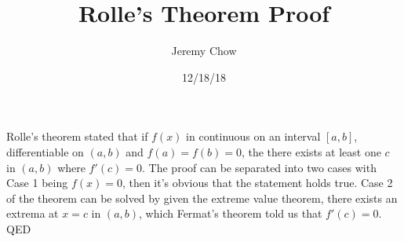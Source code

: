 \documentclass[12pt]{article}
\title{Rolle's Theorem Proof}
\author{Jeremy Chow}
\date{12/18/18}
\begin{document}
\maketitle
Rolle's theorem stated that if $f(x)$ in continuous on an interval $[a,b]$, differentiable on $(a,b)$ and $f(a)=f(b)=0$, the there exists at least one $c$ in $(a,b)$ where $f'(c)=0$. The proof can be separated into two cases with Case 1 being $f(x)=0$, then it's obvious that the statement holds true. Case 2 of the theorem can be solved by given the extreme value theorem, there exists an extrema at $x=c$ in $(a,b)$, which Fermat's theorem told us that $f'(c)=0$. QED
\end{document}
